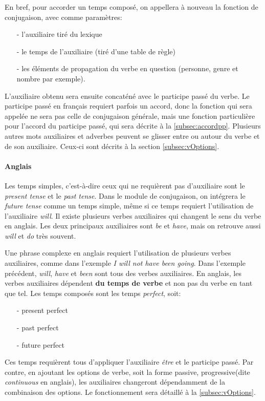 \documentclass[11pt]{article} %
\newcommand{\real}[1]{\emph{#1}}
\begin{document}
En bref, pour accorder un temps
composé, on appellera à nouveau la fonction de conjugaison, avec comme
paramètres:
\begin{itemize}
\item[-] l'auxiliaire tiré du lexique
\item[-] le temps de l'auxiliaire (tiré d'une table de règle)
\item[-] les éléments de propagation du verbe en question (personne, genre et nombre par exemple).
\end{itemize}
L'auxiliaire obtenu
sera ensuite concaténé avec le participe passé du verbe. Le participe passé 
en français requiert
parfois un accord, donc la fonction qui sera appelée ne sera pas celle
de conjugaison générale, mais une fonction particulière pour l'accord du
participe passé, qui sera décrite à la \autoref{subsec:accordpp}. Plusieurs
autres mots auxiliaires et adverbes peuvent se glisser entre ou autour
du verbe et de son auxiliaire. Ceux-ci sont décrits à la section
\autoref{subsec:vOptions}.

\paragraph{Anglais}

Les temps simples, c'est-à-dire ceux qui ne requièrent pas d'auxiliaire
sont le \emph{present tense} et le \emph{past tense}. Dans le module de
conjugaison, on intégrera le \emph{future tense} comme un temps simple, même si 
ce temps requiert l'utilisation de l'auxiliaire \emph{will}.
Il existe plusieurs verbes auxiliaires qui changent
le sens du verbe en anglais. Les deux principaux auxiliaires sont \emph{be}
et \emph{have}, mais on retrouve aussi \emph{will} et \emph{do} très souvent.

Une phrase complexe en anglais requiert l'utilisation de plusieurs verbes auxiliaires,
comme dans l'exemple \real{I will not have been going}. Dans l'exemple
précédent, \emph{will}, \emph{have} et \emph{been} sont tous des verbes
auxiliaires. En anglais,
les verbes auxiliaires dépendent \textbf{du temps de verbe} et non pas du 
verbe en tant que tel. Les temps composés sont les
temps \emph{perfect}, soit:
\begin{itemize}
\item[-]present perfect
\item[-]past perfect
\item[-]future perfect
\end{itemize} Ces temps requièrent tous d'appliquer l'auxiliaire
\emph{être} et le participe passé. Par contre, en ajoutant les options
de verbe, soit la forme passive, progressive(dite \emph{continuous}
en anglais), les auxiliaires changeront dépendamment de la combinaison
des options. Le fonctionnement sera détaillé à la \autoref{subsec:vOptions}.
\end{document}
